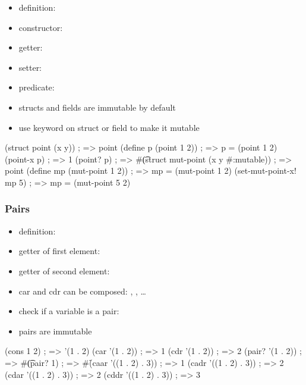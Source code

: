 \documentclass[a4paper,landscape,10pt]{article}
\begin{document}
\begin{multicols*}{2}
  \begin{itemize}
    \item definition: 
    \item constructor: 
    \item getter: 
    \item setter: 
    \item predicate: 
    \item structs and fields are immutable by default
    \item use  keyword on struct or field to make it mutable
  \end{itemize}

  \begin{racket}
(struct point (x y)) ; => point
(define p (point 1 2)) ; => p = (point 1 2)
(point-x p) ; => 1
(point? p) ; => #\t

(struct mut-point (x y #:mutable)) ; => point
(define mp (mut-point 1 2)) ; => mp = (mut-point 1 2)
(set-mut-point-x! mp 5) ; => mp = (mut-point 5 2)
\end{racket}

  \subsubsection{Pairs}

  \begin{itemize}
    \item definition: 
    \item getter of first element: 
    \item getter of second element: 
    \item car and cdr can be composed: , , \ldots
    \item check if a variable is a pair: 
    \item pairs are immutable
  \end{itemize}

  \begin{racket}
(cons 1 2) ; => '(1 . 2)
(car '(1 . 2)) ; => 1
(cdr '(1 . 2)) ; => 2
(pair? '(1 . 2)) ; => #\t
(pair? 1) ; => #\f
(caar '((1 . 2) . 3)) ; => 1
(cadr '((1 . 2) . 3)) ; => 2
(cdar '((1 . 2) . 3)) ; => 2
(cddr '((1 . 2) . 3)) ; => 3
\end{racket}


\end{multicols*}
\end{document}
